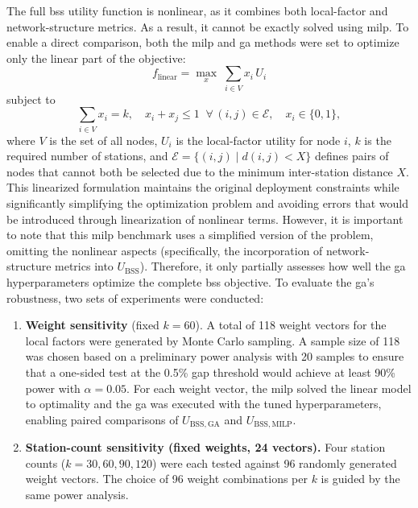         The full \ac{bss} utility function is nonlinear, as it combines both local-factor and network-structure metrics. As a result, it cannot be exactly solved using \ac{milp}. To enable a direct comparison, both the \ac{milp} and \ac{ga} methods were set to optimize only the linear part of the objective:
        \[
        f_{\mathrm{linear}} = \max_{x}\;\sum_{i\in V} x_i\,U_i
        \]
        subject to  
        \[
        \sum_{i\in V} x_i = k,\quad
        x_i + x_j \le 1\;\;\forall\,(i,j)\in\mathcal{E},\quad
        x_i\in\{0,1\},
        \]
        where \(V\) is the set of all nodes, \(U_i\) is the local-factor utility for node \(i\), \(k\) is the required number of stations, and \(\mathcal{E}=\{(i,j)\mid d(i,j)<X\}\) defines pairs of nodes that cannot both be selected due to the minimum inter-station distance \(X\). This linearized formulation maintains the original deployment constraints while significantly simplifying the optimization problem and avoiding errors that would be introduced through linearization of nonlinear terms. However, it is important to note that this \ac{milp} benchmark uses a simplified version of the problem, omitting the nonlinear aspects (specifically, the incorporation of network-structure metrics into $U_{\mathrm{BSS}}$). Therefore, it only partially assesses how well the \ac{ga} hyperparameters optimize the complete \ac{bss} objective. To evaluate the \ac{ga}'s robustness, two sets of experiments were conducted:

        \begin{enumerate}
        \item \textbf{Weight sensitivity} (fixed $k=60$).
            A total of 118 weight vectors for the local factors were generated by Monte Carlo sampling. A sample size of 118 was chosen based on a preliminary power analysis with 20 samples to ensure that a one-sided test at the 0.5\% gap threshold would achieve at least 90\% power with \(\alpha=0.05\). For each weight vector, the \ac{milp} solved the linear model to optimality and the \ac{ga} was executed with the tuned hyperparameters, enabling paired comparisons of \(U_{\mathrm{BSS,GA} }\) and \(U_{\mathrm{BSS,MILP}}\).

        \item \textbf{Station-count sensitivity (fixed weights, 24 vectors).}  
            Four station counts (\(k=30,60,90,120\)) were each tested against 96 randomly generated weight vectors. The choice of 96 weight combinations per \(k\) is guided by the same power analysis.

        \end{enumerate}

